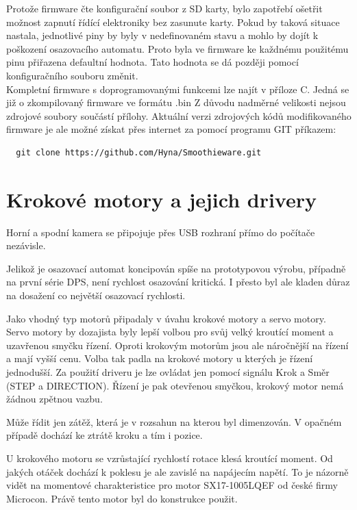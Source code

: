 Protože firmware čte konfigurační soubor z SD karty, bylo zapotřebí ošetřit možnost zapnutí řídící elektroniky bez zasunute karty. Pokud by taková situace nastala, jednotlivé piny by byly v nedefinovaném stavu a mohlo by dojít k poškození osazovacího automatu. Proto byla ve firmware ke každnému použitému pinu přiřazena defaultní hodnota. Tato hodnota se dá později pomocí konfiguračního souboru změnit.
\\

Kompletní firmware s doprogramovanými funkcemi lze najít v příloze C. Jedná se již o zkompilovaný firmware ve formátu .bin  Z důvodu nadměrné velikosti nejsou zdrojové soubory součástí přílohy. Aktuální verzi zdrojových kódů modifikovaného firmware je ale možné získat přes internet za pomocí programu GIT příkazem:
\begin{verbatim}
  git clone https://github.com/Hyna/Smoothieware.git
\end{verbatim}
	




\section{Krokové motory a jejich drivery}

Horní a spodní kamera se připojuje přes USB rozhraní přímo do počítače nezávisle.

Jelikož je osazovací automat koncipován spíše na prototypovou výrobu, případně na první série DPS, není rychlost osazování kritická. I přesto byl ale kladen důraz na dosažení co největší osazovací rychlosti.

Jako vhodný typ motorů připadaly v úvahu krokové motory a servo motory. Servo motory by dozajista byly lepší volbou pro svůj velký kroutící moment a uzavřenou smyčku řízení. Oproti krokovým motorům jsou ale náročnější na řízení a mají vyšší cenu.
Volba tak padla na krokové motory u kterých je řízení jednodušší. Za použití driveru je lze ovládat jen pomocí signálu Krok a Směr (STEP a DIRECTION). Řízení je pak otevřenou smyčkou, krokový motor nemá žádnou zpětnou vazbu.

Může řídit jen zátěž, která je v rozsahun na kterou byl dimenzován. V opačném případě dochází ke ztrátě kroku a tím i pozice.

U krokového motoru se vzrůstající rychlostí rotace klesá kroutící moment. Od jakých otáček dochází k poklesu je ale zavislé na napájecím napětí. To je názorně vidět na momentové charakteristice pro motor SX17-1005LQEF od české firmy Microcon. Právě tento motor byl do konstrukce použit.


